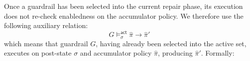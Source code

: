 


Once a guardrail has been selected into the current repair phase, its execution
does not re-check enabledness on the accumulator policy. We therefore use the
following auxiliary relation:
\[
G \models^{\mathsf{act}}_{\sigma} \hat\pi \to \hat\pi'
\]
which means that guardrail $G$, having already been selected into the active set,
executes on post-state $\sigma$ and accumulator policy $\hat\pi$, producing
$\hat\pi'$. Formally:

